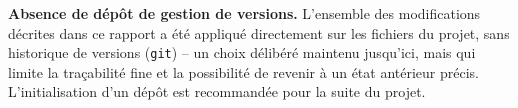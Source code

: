 \textbf{Absence de dépôt de gestion de versions.} L'ensemble des modifications décrites dans ce rapport a été appliqué directement sur les fichiers du projet, sans historique de versions (\texttt{git}) -- un choix délibéré maintenu jusqu'ici, mais qui limite la traçabilité fine et la possibilité de revenir à un état antérieur précis. L'initialisation d'un dépôt est recommandée pour la suite du projet.
